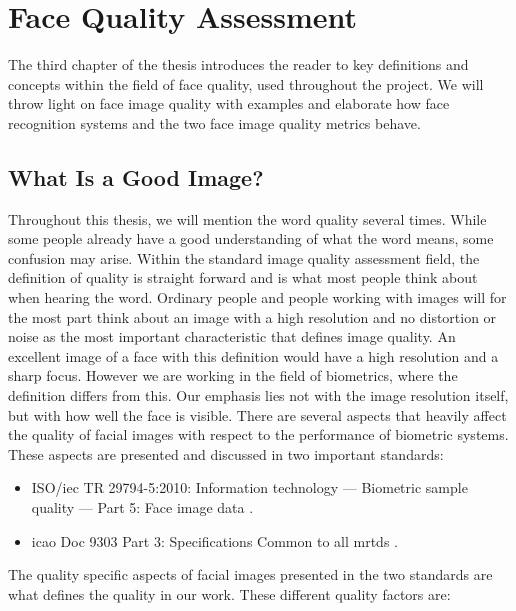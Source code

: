 \chapter{Face Quality Assessment}
\label{chap:FQA}
The third chapter of the thesis introduces the reader to key definitions and concepts within the field of face quality, used throughout the project. We will throw light on face image quality with examples and elaborate how face recognition systems and the two face image quality metrics behave.  

\section{What Is a Good Image?}
\label{sec:setup}
Throughout this thesis, we will mention the word quality several times. While some people already have a good understanding of what the word means, some confusion may arise. Within the standard image quality assessment field, the definition of quality is straight forward and is what most people think about when hearing the word. Ordinary people and people working with images will for the most part think about an image with a high resolution and no distortion or noise as the most important characteristic that defines image quality. An excellent image of a face with this definition would have a high resolution and a sharp focus. However we are working in the field of biometrics, where the definition differs from this. Our emphasis lies not with the image resolution itself, but with how well the face is visible. There are several aspects that heavily affect the quality of facial images with respect to the performance of biometric systems. These aspects are presented and discussed in two important standards: 
%
\begin{itemize}
    \item ISO/\acrshort{iec} TR 29794-5:2010: Information technology — Biometric sample quality — Part 5: Face image data \cite{ISO50912}.
    \item \acrshort{icao} Doc 9303 Part 3: Specifications Common to all \acrshort{mrtd}s \cite{ICAO1}. 
\end{itemize}

The quality specific aspects of facial images presented in the two standards are what defines the quality in our work. These different quality factors are:  

